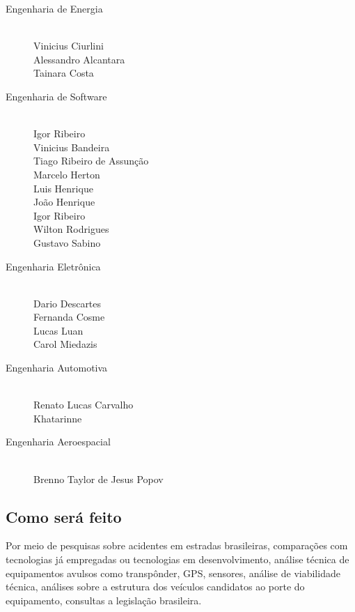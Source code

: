 \begin{description}
  \item[Engenharia de Energia] \hfill
  \\Vinicius Ciurlini
  \\Alessandro Alcantara
  \\Tainara Costa
  \item[Engenharia de Software] \hfill
  \\Igor Ribeiro
  \\Vinicius Bandeira
  \\Tiago Ribeiro de Assunção
  \\Marcelo Herton
  \\Luis Henrique
  \\João Henrique
  \\Igor Ribeiro
  \\Wilton Rodrigues
  \\Gustavo Sabino
  \item[Engenharia Eletrônica] \hfill
  \\Dario Descartes
  \\Fernanda Cosme
  \\Lucas Luan
  \\Carol Miedazis
  \item[Engenharia Automotiva] \hfill
  \\Renato Lucas Carvalho
  \\Khatarinne
  \item[Engenharia Aeroespacial] \hfill
  \\Brenno Taylor de Jesus Popov 
\end{description}

\subsection{Como será feito}
Por meio de pesquisas sobre acidentes em estradas brasileiras, comparações com tecnologias já empregadas ou tecnologias em desenvolvimento,  análise técnica de equipamentos avulsos como transpônder, GPS,  sensores, análise de viabilidade técnica, análises sobre a estrutura dos veículos candidatos ao porte do equipamento, consultas a legislação brasileira.

